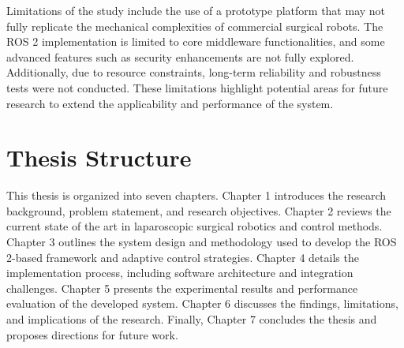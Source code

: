 Limitations of the study include the use of a prototype platform that may not fully replicate the mechanical complexities of commercial surgical robots. The ROS 2 implementation is limited to core middleware functionalities, and some advanced features such as security enhancements are not fully explored. Additionally, due to resource constraints, long-term reliability and robustness tests were not conducted. These limitations highlight potential areas for future research to extend the applicability and performance of the system.

\section{Thesis Structure}
\label{section:thesis_structure}

This thesis is organized into seven chapters. Chapter 1 introduces the research background, problem statement, and research objectives. Chapter 2 reviews the current state of the art in laparoscopic surgical robotics and control methods. Chapter 3 outlines the system design and methodology used to develop the ROS 2-based framework and adaptive control strategies. Chapter 4 details the implementation process, including software architecture and integration challenges. Chapter 5 presents the experimental results and performance evaluation of the developed system. Chapter 6 discusses the findings, limitations, and implications of the research. Finally, Chapter 7 concludes the thesis and proposes directions for future work.

